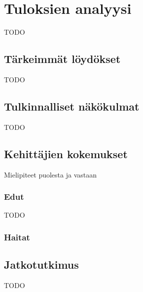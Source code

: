 \vspace{21.5pt}
\chapter{Tuloksien analyysi}
TODO

\section{Tärkeimmät löydökset}

TODO

\section{Tulkinnalliset näkökulmat}

TODO


\section{Kehittäjien kokemukset}

Mielipiteet puolesta ja vastaan

\subsection{Edut}

TODO

\subsection{Haitat}

\section{Jatkotutkimus}

TODO
